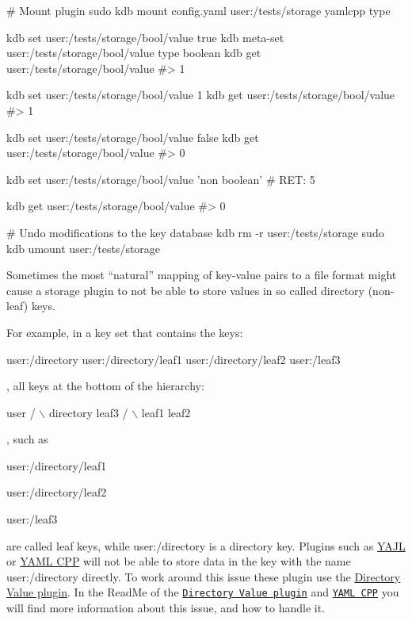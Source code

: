 \begin{DoxyCode}
# Mount plugin
sudo kdb mount config.yaml user:/tests/storage yamlcpp type

kdb set user:/tests/storage/bool/value true
kdb meta-set user:/tests/storage/bool/value type boolean
kdb get user:/tests/storage/bool/value
#> 1

kdb set user:/tests/storage/bool/value 1
kdb get user:/tests/storage/bool/value
#> 1

kdb set user:/tests/storage/bool/value false
kdb get user:/tests/storage/bool/value
#> 0

kdb set user:/tests/storage/bool/value 'non boolean'
# RET: 5

kdb get user:/tests/storage/bool/value
#> 0

# Undo modifications to the key database
kdb rm -r user:/tests/storage
sudo kdb umount user:/tests/storage
\end{DoxyCode}


Sometimes the most “natural” mapping of key-\/value pairs to a file format might cause a storage plugin to not be able to store values in so called directory (non-\/leaf) keys.

For example, in a key set that contains the keys\+:


\begin{DoxyCode}
user:/directory
user:/directory/leaf1
user:/directory/leaf2
user:/leaf3
\end{DoxyCode}


, all keys at the bottom of the hierarchy\+:


\begin{DoxyCode}
        user
      /      \(\backslash\)
  directory  leaf3
   /     \(\backslash\)
leaf1   leaf2
\end{DoxyCode}


, such as


\begin{DoxyItemize}
\item {\ttfamily user\+:/directory/leaf1}
\item {\ttfamily user\+:/directory/leaf2}
\item {\ttfamily user\+:/leaf3}
\end{DoxyItemize}

are called leaf keys, while {\ttfamily user\+:/directory} is a directory key. Plugins such as \hyperlink{autotoc_md777_src_plugins_yajl_README_md}{Y\+A\+JL} or \hyperlink{autotoc_md807_src_plugins_yamlcpp_README_md}{Y\+A\+ML C\+PP} will not be able to store data in the key with the name {\ttfamily user\+:/directory} directly. To work around this issue these plugin use the \hyperlink{autotoc_md170_src_plugins_directoryvalue_README_md}{Directory Value plugin}. In the Read\+Me of the \href{https://www.libelektra.org/plugins/directoryvalue}{\tt Directory Value plugin} and \href{https://www.libelektra.org/plugins/yamlcpp}{\tt Y\+A\+ML C\+PP} you will find more information about this issue, and how to handle it.

